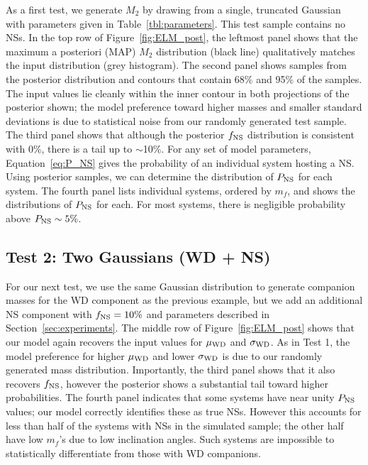 \documentclass[apjl]{emulateapj}
\newcommand{\mf}{m_f}
\begin{document}
As a first test, we generate $M_2$ by drawing from a single, truncated Gaussian with parameters given in Table~\ref{tbl:parameters}. This test sample contains no NSs. In the top row of Figure~\ref{fig:ELM_post}, the leftmost panel shows that the maximum a posteriori (MAP) $M_2$ distribution (black line) qualitatively matches the input distribution (grey histogram). The second panel shows samples from the posterior distribution and contours that contain 68\% and 95\% of the samples. The input values lie cleanly within the inner contour in both projections of the posterior shown; the model preference toward higher masses and smaller standard deviations is due to statistical noise from our randomly generated test sample. The third panel shows that although the posterior $f_{\rm NS}$ distribution is consistent with 0\%, there is a tail up to $\sim$10\%. 
For any set of model parameters, Equation~\ref{eq:P_NS} gives the probability of an individual system hosting a NS. Using posterior samples, we can determine the distribution of $P_{\rm NS}$ for each system. The fourth panel lists individual systems, ordered by $\mf$, and shows the distributions of $P_{\rm NS}$ for each. For most systems, there is negligible probability above $P_{\rm NS}\sim 5\%$.



\subsection{Test 2: Two Gaussians (WD + NS)} \label{sec:exp2}
For our next test, we use the same Gaussian distribution to generate companion masses for the WD component as the previous example, but we add an additional NS component with $f_{\rm NS} = 10\%$ and parameters described in Section~\ref{sec:experiments}. The middle row of Figure~\ref{fig:ELM_post} shows that our model again recovers the input values for $\mu_{\rm WD}$ and $\sigma_{\rm WD}$. As in Test 1, the model preference for higher $\mu_{\rm WD}$ and lower $\sigma_{\rm WD}$ is due to our randomly generated mass distribution. Importantly, the third panel shows that it also recovers $f_{\rm NS}$, however the posterior shows a substantial tail toward higher probabilities. The fourth panel indicates that some systems have near unity $P_{\rm NS}$ values; our model correctly identifies these as true NSs. However this accounts for less than half of the systems with NSs in the simulated sample; the other half have low $\mf$'s due to low inclination angles. Such systems are impossible to statistically differentiate from those with WD companions. 
\end{document}
